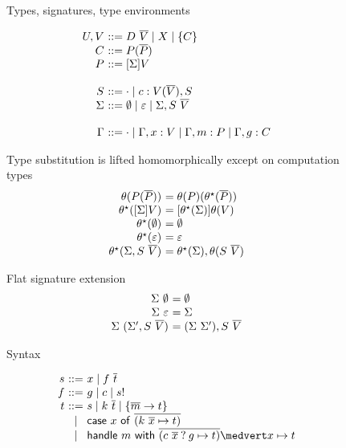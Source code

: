 \documentclass[preprint]{sigplanconf}
\newcommand{\many}{\overline}
\newcommand{\sig}{S}
\newcommand{\sigs}{\Sigma}
\newcommand{\effbox}[1]{[#1]}
\newcommand{\keyword}[1]{\mathsf{#1}}
\newcommand{\handleSymbol}{\mathbin{?}}
\newcommand{\handle}[2]{{#1} \handleSymbol {#2}}
\newcommand{\thunk}[1]{\{{#1}\}}
\newcommand{\force}[1]{{#1}!}
\begin{document}
\begin{figure*}
Types, signatures, type environments

\[
\begin{array}{@{}r@{~}l@{}}
U, V &::= D~\many{V} \mid X \mid  \thunk{C} \\
C    &::= P(\many{P}) \\
P    &::= \effbox{\sigs}V \\
\\
\sig  &::= \cdot \mid c : V(\many{V}), \sig \\
\sigs &::=
  \emptyset \mid \varepsilon \mid \sigs, \sig~\many{V} \\
\\
\Gamma &::= \cdot \mid \Gamma, x:V \mid \Gamma, m:P \mid \Gamma, g:C \\
\end{array}
\]

Type substitution is lifted homomorphically except on computation types
\[
\begin{array}{@{}r@{~}l@{}}
\theta(P(\many{P})) &= \theta(P)(\theta^\star(\many{P})) \\
\theta^\star(\effbox{\sigs}V) &= \effbox{\theta^\star(\sigs)}\theta(V) \\
\theta^\star(\emptyset) &= \emptyset \\
\theta^\star(\varepsilon) &= \varepsilon \\
\theta^\star(\sigs, \sig~\many{V}) &= \theta^\star(\sigs), \theta(S~\many{V}) \\
\end{array}
\]

Flat signature extension
\[
\begin{array}{@{}r@{~}l@{}}
\sigs~\emptyset &= \emptyset \\
\sigs~\varepsilon &= \sigs \\
\sigs~(\sigs', \sig~\many{V}) &= (\sigs~\sigs'), \sig~\many{V} \\
\end{array}
\]

Syntax

\[
\begin{array}{@{}r@{~}c@{~}l@{}}
s &::=& x \mid f~\many{t}       \\ %
f &::=& g \mid c \mid \force{s} \\ %
t &::=& s \mid k~\many{t}          %
          \mid \thunk{\many{m} \to t}  \\ 
  &\mid& \keyword{case}~x~\keyword{of}~
           \many{(k~\many{x} \mapsto t)} \\
  &\mid& \keyword{handle} ~m~ \keyword{with}~
           \many{(\handle{c~\many{x}}{g} \mapsto t)} \medvert
            x        \mapsto t \\
\end{array}
\]


\end{figure*}
\end{document}
